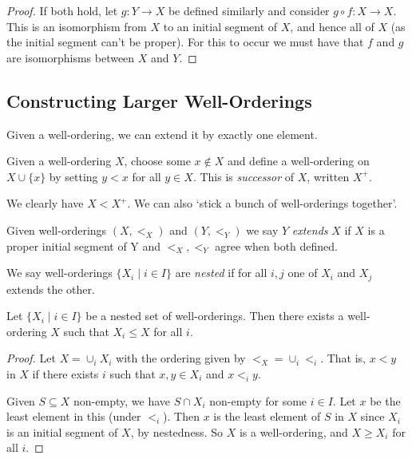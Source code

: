 \documentclass[a3paper, 10pt]{article}
\renewcommand{\vocab}[1]{\emph{#1}}
\begin{document}
\begin{multicols*}{5}
\begin{proof}
If both hold, let $g: Y \rightarrow X$ be defined similarly and consider $g \circ f: X \rightarrow X$. This is an isomorphism from $X$ to an initial segment of $X$, and hence all of $X$ (as the initial segment can't be proper). For this to occur we must have that $f$ and $g$ are isomorphisms between $X$ and $Y$.
\end{proof}


\subsection{Constructing Larger Well-Orderings}


Given a well-ordering, we can extend it by exactly one element.

\begin{definition}[Successor]
  Given a well-ordering $X$, choose some $x \not \in X$ and define a well-ordering on $X \cup \{x\}$ by setting $y < x$
  for all $y \in X$. This is \vocab{successor} of $X$, written $X^+$. 
\end{definition}
We clearly have $X < X^+$.
We can also `stick a bunch of well-orderings together'.

\begin{definition}[Extensions]
  Given well-orderings $(X, <_X)$ and $(Y, <_Y)$ we say $Y$ \vocab{extends} $X$ if $X$ is a proper initial segment of Y and $<_X, <_Y$ agree when both defined.

We say well-orderings $\{X_i \mid i \in I\}$ are \vocab{nested} if for all $i, j$ one of $X_i$ and $X_j$ extends the other.
\end{definition}

\begin{proposition}  
  Let $\{X_i \mid i \in I\}$ be a nested set of well-orderings. Then there exists a well-ordering $X$ such that $X_i \leq X$ for all $i$.
\end{proposition}
\begin{proof}
  Let $X = \cup_i X_i$ with the ordering given by $<_X = \cup_i <_i$. That is, $x < y$ in $X$ if there exists $i$ such that $x, y \in X_i$ and $x <_i y$.

  Given $S \subseteq X$ non-empty, we have $S \cap X_i$ non-empty for some $i\in I$. Let $x$ be the least element in this (under $<_i$). Then $x$ is the least element of $S$ in $X$ since $X_i$ is an initial segment of $X$, by nestedness. So $X$ is a well-ordering, and $X \geq X_i$ for all $i$.
\end{proof}



\end{multicols*}
\end{document}
